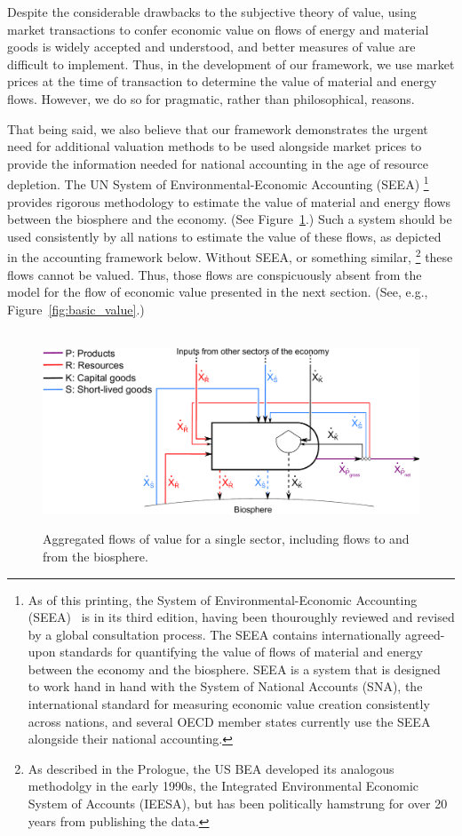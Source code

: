 Despite the considerable drawbacks to the subjective theory of value, 
using market transactions to confer economic value
on flows of energy and material goods is widely accepted and understood, and 
better measures of value are difficult to implement. 
Thus, in the development of our framework, 
we use market prices at the time of transaction to determine the value of 
material and energy flows.
However, we do so for pragmatic, rather than philosophical, reasons.

That being said, we also believe that our framework demonstrates the  
urgent need for additional valuation methods to be used
alongside market prices to provide the information
needed for national accounting in the age of resource depletion. 
The UN System of Environmental-Economic Accounting (SEEA)%
	\footnote{
	As of this printing, 
	the System of Environmental-Economic Accounting (SEEA)~\cite{UNSEEA2014}
	is in its third edition, having been thouroughly reviewed and revised 
	by a global consultation process. 
	The SEEA contains internationally agreed-upon standards for quantifying the 
	value of flows of material and energy between the economy and the biosphere. 
	SEEA is a system that is designed to 
	work hand in hand with the System of National Accounts (SNA), 
	the international standard for measuring economic value creation consistently across nations,
	and several OECD member states
	currently use the SEEA alongside their national accounting.
	} 
provides rigorous methodology to estimate the value 
of material and energy flows between the biosphere and the economy.
(See Figure~\ref{fig:basic_value_with_biosphere_flows}.)
Such a system should be used consistently by all
nations to estimate the value of these flows, 
as depicted in the accounting framework below.
Without SEEA, or something similar,%
	\footnote{
	As described in the Prologue, the US BEA developed
	its analogous methodolgy in the early 1990s, 
	the Integrated Environmental Economic System of Accounts (IEESA), 
	but has been politically hamstrung for
	over 20 years from publishing the data.
	}
these flows cannot be valued. 
Thus, those flows are conspicuously 
absent from the model for the flow of economic value presented in the next section.
(See, e.g., Figure~\ref{fig:basic_value}.)

\begin{figure}[ht!]
\centering\
\includegraphics[width=0.8\linewidth]{Part_2/Chapter_Values/images/PERKS_basic_unit_value_with_biosphere_flows.pdf}
\caption[Aggregated flows of value for a single sector including flows to and from the biosphere]{Aggregated flows of value for a single sector, including flows to and from the biosphere.}
\label{fig:basic_value_with_biosphere_flows}
\end{figure}


